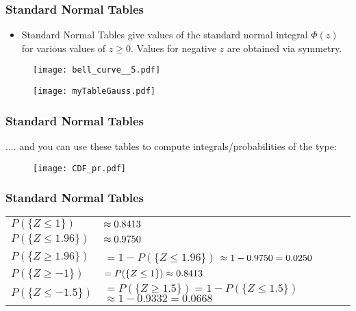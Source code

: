 \documentclass[notes=show,smaller,handout]{beamer}\usepackage[]{graphicx}\usepackage[]{color}
\newenvironment{stepitemize}{\begin{itemize}[<+->]}{\end{itemize} }
\begin{document}
\begin{frame}%

\frametitle{Standard Normal Tables}

\begin{stepitemize}
\item Standard Normal Tables give values of the standard normal integral $\Phi(z)$ for various values of $z\geq 0$.  Values for negative $z$ are obtained via symmetry.
\end{stepitemize}


\begin{figure}[ptb]\centering
\texttt{[image: bell\_curve\_\_5.pdf]}%
\end{figure}%
\end{frame}%


\begin{frame}%
\begin{figure}[ptb]\centering
\texttt{[image: myTableGauss.pdf]}%
\end{figure}%
\end{frame}%

\begin{frame}%
\frametitle{Standard Normal Tables}
.... and you can use these tables to compute integrals/probabilities of the type:
\begin{figure}[ptb]\centering
\texttt{[image: CDF\_pr.pdf]}%
\end{figure}%
\end{frame}%

\begin{frame}%
\frametitle{Standard Normal Tables}

\begin{example}[Prob of $Z$]


\noindent
\begin{tabular}{ll}
$P(\{Z\leq 1\})$ & $\approx0.8413\bigskip $ \\
$P(\{Z\leq 1.96\})$ & $\approx0.9750\bigskip $ \\
$P(\{Z\geq 1.96\})$ & $=1-P(\{Z\leq 1.96\})$ $\approx1-0.9750=0.0250\bigskip $\\
$P(\{Z\geq -1\})$ & $=P(\{Z\leq 1\})\approx0.8413\bigskip $ \\
$P(\{Z\leq -1.5\})$ & $=P(\{Z\geq 1.5\}) =1-P(\{Z\leq 1.5\})$ $\approx1-0.9332=0.0668$%
\end{tabular}

\end{example}
\end{frame}%
\end{document}
